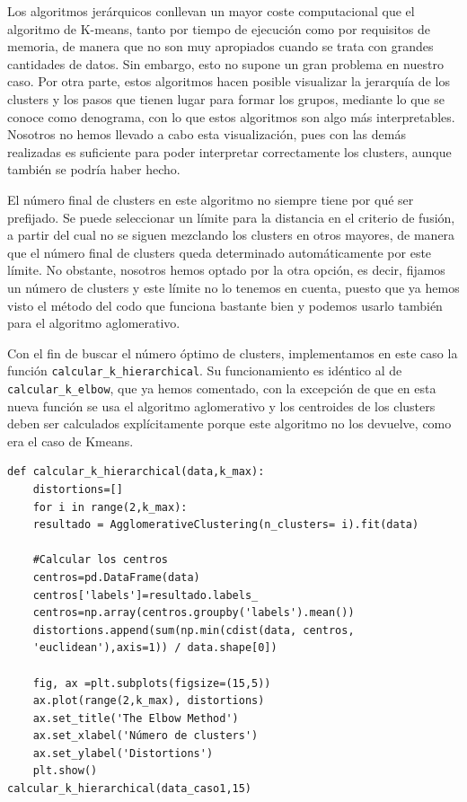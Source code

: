 \documentclass[a4paper,11pt]{book}
\begin{document}
Los algoritmos jerárquicos conllevan un mayor coste computacional que el algoritmo de K-means, tanto por tiempo de ejecución como por requisitos de memoria, de manera que no son muy apropiados cuando se trata con grandes cantidades de datos. Sin embargo, esto no supone un gran problema en nuestro caso. Por otra parte, estos algoritmos hacen posible visualizar la jerarquía de los clusters y los pasos que tienen lugar para formar los grupos, mediante lo que se conoce como denograma, con lo que estos algoritmos son algo más interpretables. Nosotros no hemos llevado a cabo esta visualización, pues con las demás realizadas es suficiente para poder interpretar correctamente los clusters, aunque también se podría haber hecho. 

El número final de clusters en este algoritmo no siempre tiene por qué ser prefijado. Se puede seleccionar un límite para la distancia en el criterio de fusión, a partir del cual no se siguen mezclando los clusters en otros mayores, de manera que el número final de clusters queda determinado automáticamente por este límite. No obstante, nosotros hemos optado por la otra opción, es decir, fijamos un número de clusters y este límite no lo tenemos en cuenta, puesto que ya hemos visto el método del codo que funciona bastante bien y podemos usarlo también para el algoritmo aglomerativo.   

Con el fin de buscar el número óptimo de clusters, implementamos en este caso la función \texttt{calcular_k_hierarchical}. Su funcionamiento es idéntico al de \texttt{calcular_k_elbow}, que ya hemos comentado, con la excepción de que en esta nueva función se usa el algoritmo aglomerativo y los centroides de los clusters deben ser calculados explícitamente porque este algoritmo no los devuelve, como era el caso de Kmeans. 

\begin{verbatim}
def calcular_k_hierarchical(data,k_max):
	distortions=[] 
	for i in range(2,k_max):
	resultado = AgglomerativeClustering(n_clusters= i).fit(data)
	
	#Calcular los centros
	centros=pd.DataFrame(data)
	centros['labels']=resultado.labels_
	centros=np.array(centros.groupby('labels').mean())
	distortions.append(sum(np.min(cdist(data, centros, 
	'euclidean'),axis=1)) / data.shape[0])
	
	fig, ax =plt.subplots(figsize=(15,5))
	ax.plot(range(2,k_max), distortions)
	ax.set_title('The Elbow Method')
	ax.set_xlabel('Número de clusters')
	ax.set_ylabel('Distortions')
	plt.show()
calcular_k_hierarchical(data_caso1,15)
\end{verbatim}
\end{document}
